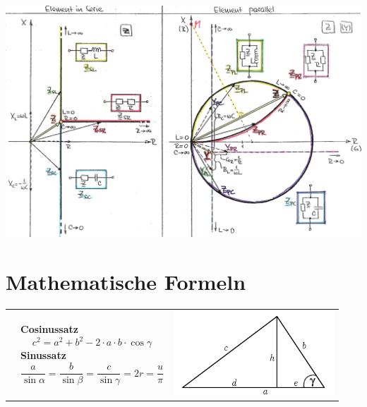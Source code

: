\includegraphics[width=18cm]{./bilder/impedanztrafo.png}

\section{Mathematische Formeln}
\begin{tabular}{lll}
	& \parbox{9.5cm}{
		\textbf{Cosinussatz} \\
		$$c^2 = a^2 + b^2 - 2 \cdot a \cdot b \cdot \cos \gamma$$\\
		\textbf{Sinussatz} \\
		$$\frac{a}{\sin \alpha} = \frac{b}{\sin \beta} = \frac{c}{\sin \gamma} = 2r =
		\frac{u}{\pi}$$}
	& \parbox{8cm}{
		\includegraphics[width=6cm]{./bilder/cosinussatz.png}}

\end{tabular}




